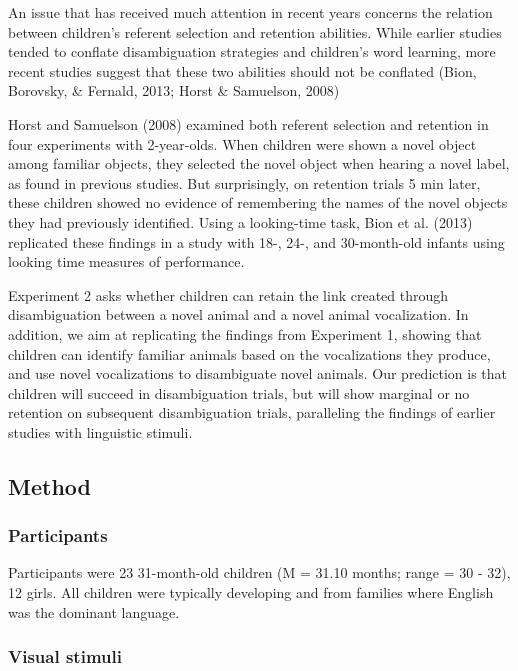 \documentclass[english,floatsintext,man]{apa6}
\theoremstyle{definition}
\theoremstyle{definition}
\theoremstyle{definition}
\theoremstyle{remark}
\begin{document}
An issue that has received much attention in recent years concerns the
relation between children's referent selection and retention abilities.
While earlier studies tended to conflate disambiguation strategies and
children's word learning, more recent studies suggest that these two
abilities should not be conflated (Bion, Borovsky, \& Fernald, 2013;
Horst \& Samuelson, 2008)

Horst and Samuelson (2008) examined both referent selection and
retention in four experiments with 2-year-olds. When children were shown
a novel object among familiar objects, they selected the novel object
when hearing a novel label, as found in previous studies. But
surprisingly, on retention trials 5 min later, these children showed no
evidence of remembering the names of the novel objects they had
previously identified. Using a looking-time task, Bion et al. (2013)
replicated these findings in a study with 18-, 24-, and 30-month-old
infants using looking time measures of performance.

Experiment 2 asks whether children can retain the link created through
disambiguation between a novel animal and a novel animal vocalization.
In addition, we aim at replicating the findings from Experiment 1,
showing that children can identify familiar animals based on the
vocalizations they produce, and use novel vocalizations to disambiguate
novel animals. Our prediction is that children will succeed in
disambiguation trials, but will show marginal or no retention on
subsequent disambiguation trials, paralleling the findings of earlier
studies with linguistic stimuli.

\subsection{Method}\label{method-1}

\subsubsection{Participants}\label{participants-1}

Participants were 23 31-month-old children (M = 31.10 months; range = 30
- 32), 12 girls. All children were typically developing and from
families where English was the dominant language.

\subsubsection{Visual stimuli}\label{visual-stimuli-1}
\end{document}
